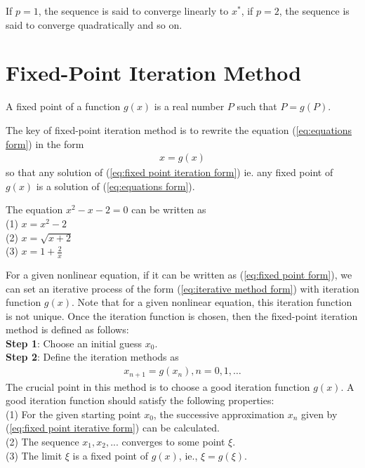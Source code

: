 \begin{remark}
    If $p=1$, the sequence is said to converge linearly to $x^*$, 
    if $p=2$, the sequence is said to converge quadratically and so on.
\end{remark}

\section{Fixed-Point Iteration Method}
\begin{definition}{}{}
    A fixed point of a function $g(x)$ is a real number $P$ such that $P=g(P)$.
\end{definition}

The key of fixed-point iteration method is to rewrite the equation (\ref{eq:equations form}) in the form
\begin{align}
    \label{eq:fixed point form}
    x=g(x)
\end{align}
so that any solution of (\ref{eq:fixed point iteration form}) ie. any fixed point of $g(x)$ is a solution of (\ref{eq:equations form}).
\begin{example}{}{}
    The equation $x^2-x-2=0$ can be written as\\
    (1) $x=x^2-2$\\
    (2) $x=\sqrt{x+2}$\\
    (3) $x=1+\frac{2}{x}$
\end{example}

For a given nonlinear equation, if it can be written as (\ref{eq:fixed point form}), 
we can set an iterative process of the form (\ref{eq:iterative method form})
with iteration function $g(x)$.
Note that for a given nonlinear equation, this iteration function is not unique.
Once the iteration function is chosen, then the fixed-point iteration method is defined as follows:\\
\textbf{Step 1}: Choose an initial guess $x_0$.\\
\textbf{Step 2}: Define the iteration methods as 
\begin{align}
    x_{n+1}=g(x_n),n=0,1,\dots
    \label{eq:fixed point iterative form}
\end{align}
The crucial point in this method is to choose a good iteration function $g(x)$. 
A good iteration function should satisfy the following properties:\\
(1) For the given starting point $x_0$, the successive approximation $x_n$ given by (\ref{eq:fixed point iterative form}) can be calculated.\\
(2) The sequence $x_1,x_2,...$ converges to some point $\xi$.\\
(3) The limit $\xi$ is a fixed point of $g(x)$, ie., $\xi=g(\xi)$.

